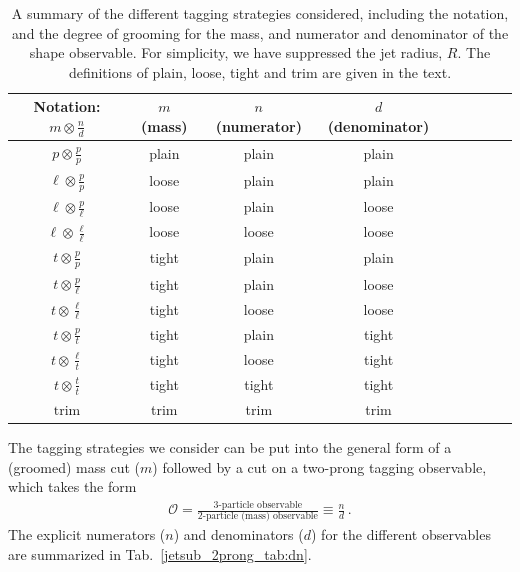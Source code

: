 \documentclass[11pt]{cernrep}
\begin{document}
\begin{table}[t!]
\begin{center}
\begin{tabular}{| c | c | c |c |c|c|c |c|c | }
  \hline                       
  Notation: $m \otimes \frac{n}{d}$ & $m$ (mass) & $n$ (numerator) & $d$ (denominator)\\
  \hline
  $p \otimes \frac{p}{p}$ & plain  &  plain & plain \\
  $\ell \otimes \frac{p}{p}$ & loose  &  plain & plain \\
  $\ell \otimes \frac{p}{\ell}$ & loose  &  plain & loose \\
  $\ell \otimes \frac{\ell}{\ell}$ & loose  &  loose & loose \\
  $t \otimes \frac{p}{p}$ & tight  &  plain & plain \\
  $t \otimes \frac{p}{\ell}$ & tight  &  plain & loose \\
  $t \otimes \frac{\ell}{\ell}$ & tight  &  loose & loose \\
  $t \otimes \frac{p}{t}$ & tight  &  plain & tight \\
  $t \otimes \frac{\ell}{t}$ & tight  &  loose & tight \\
  $t \otimes \frac{t}{t}$ & tight  &  tight & tight \\
  \hline
  $\text{trim}$ & trim &  trim & trim \\
  \hline  
\end{tabular}
\end{center}
\caption{ A summary of the different tagging strategies considered,
  including the notation, and the degree of grooming for the mass, and
  numerator and denominator of the shape observable. For simplicity,
  we have suppressed the jet radius, $R$. The definitions of plain,
  loose, tight and trim are given in the text.}
\label{jetsub_2prong_tab:tag_summary}
\end{table}

The tagging strategies we consider can be put into the general form of a (groomed) mass cut ($m$) followed by a cut on a two-prong tagging observable, which takes the form
%
\begin{align}
\mathcal{O}=\frac{\text{3-particle observable}}{\text{2-particle (mass) observable}} \equiv \frac{n}{d}\,.
\end{align}
%
The explicit numerators ($n$) and denominators ($d$) for the different observables are summarized in Tab.~\ref{jetsub_2prong_tab:dn}.
\end{document}
